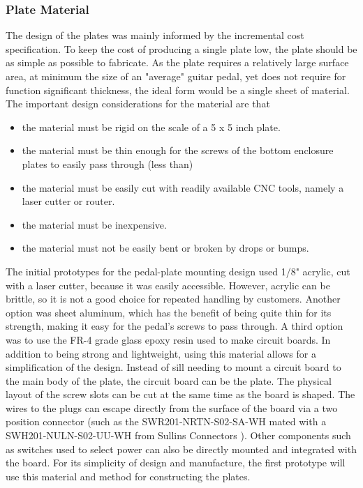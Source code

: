 \documentclass{article}
\begin{document}
		\subsubsection{Plate Material}
		\label{Plate Material}
		The design of the plates was mainly informed by the incremental cost specification.  To keep the cost of producing a single plate low, the plate should be as simple as possible to fabricate.  As the plate requires a relatively large surface area, at minimum the size of an "average" guitar pedal, yet does not require for function significant thickness, the ideal form would be a single sheet of material.  The important design considerations for the material are that 
		\begin{itemize}
			\item the material must be rigid on the scale of a 5 x 5 inch plate.
			\item the material must be thin enough for the screws of the bottom enclosure plates to easily pass through (less than)
			\item the material must be easily cut with readily available CNC tools, namely a laser cutter or router.
			\item the material must be inexpensive.
			\item the material must not be easily bent or broken by drops or bumps.
		\end{itemize}
		The initial prototypes for the pedal-plate mounting design used 1/8" acrylic, cut with a laser cutter, because it was easily accessible.  However, acrylic can be brittle, so it is not a good choice for repeated handling by customers.  Another option was sheet aluminum, which has the benefit of being quite thin for its strength, making it easy for the pedal's screws to pass through.  A third option was to use the FR-4 grade glass epoxy resin used to make circuit boards.  In addition to being strong and lightweight, using this material allows for a simplification of the design.  Instead of sill needing to mount a circuit board to the main body of the plate, the circuit board can be the plate.  The physical layout of the screw slots can be cut at the same time as the board is shaped.  The wires to the plugs can escape directly from the surface of the board via a two position connector (such as the SWR201-NRTN-S02-SA-WH mated with a SWH201-NULN-S02-UU-WH from Sullins Connectors \cite{Sullinsdatasheet}). Other components such as switches used to select power can also be directly mounted and integrated with the board.  For its simplicity of design and manufacture, the first prototype will use this material and method for constructing the plates.
\end{document}
